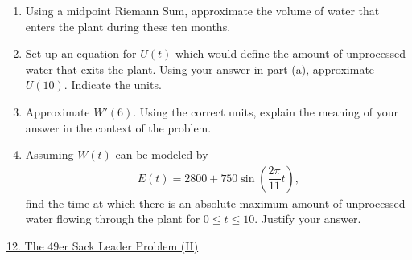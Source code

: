 \begin{enumerate}[label=\hspace{11pt}(\alph*), align=left, leftmargin=*, labelsep=0.25em]
    \item Using a midpoint Riemann Sum, approximate the volume of water that enters the plant during these ten months.
    \item Set up an equation for $U(t)$ which would define the amount of unprocessed water that exits the plant. Using your answer in part (a), approximate $U(10)$. Indicate the units.
    \item Approximate $W'(6)$. Using the correct units, explain the meaning of your answer in the context of the problem.
    \item Assuming $W(t)$ can be modeled by \begin{align*}
        E(t) = 2800 + 750\sin \left(\dfrac{2\pi}{11}t\right),
    \end{align*}
    find the time at which there is an absolute maximum amount of unprocessed water flowing through the plant for $0 \leq t \leq 10$. Justify your answer.
\end{enumerate} \vspace{11pt}

\begin{center}
    \underline{12. The 49er Sack Leader Problem (II)}
\end{center}


